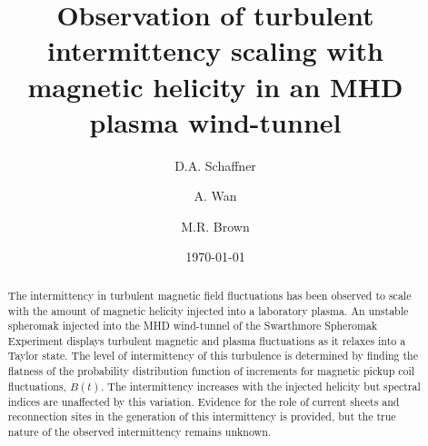 \documentclass[aps,prl,amsmath,amssymb,reprint,superscriptaddress]{revtex4-1} %
\begin{document}
\title{Observation of turbulent intermittency scaling with magnetic helicity in an MHD plasma wind-tunnel}

\author{D.A. Schaffner}
\author{A. Wan}
\author{M.R. Brown}
\date{\today}
\begin{abstract}
The intermittency in turbulent magnetic field fluctuations has been observed to scale with the amount of magnetic helicity injected into a laboratory plasma. An unstable spheromak injected into the MHD wind-tunnel of the Swarthmore Spheromak Experiment displays turbulent magnetic and plasma fluctuations as it relaxes into a Taylor state. The level of intermittency of this turbulence is determined by finding the flatness of the probability distribution function of increments for magnetic pickup coil fluctuations, $\dot{B}(t)$. The intermittency increases with the injected helicity but spectral indices are unaffected by this variation. Evidence for the role of current sheets and reconnection sites in the generation of this intermittency is provided, but the true nature of the observed intermittency remains unknown.
\end{abstract}

\maketitle
\end{document}

